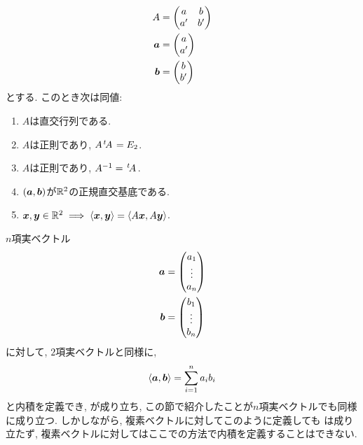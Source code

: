 \begin{prop}
  \begin{align*}
    A&=
    \begin{pmatrix}
      a&b\\
      a'&b'
    \end{pmatrix}\\
    \boldsymbol{a}&=
    \begin{pmatrix}
      a\\
      a'
    \end{pmatrix}\\
    \boldsymbol{b}&=
    \begin{pmatrix}
      b\\
      b'
    \end{pmatrix}
  \end{align*}
  とする.  このとき次は同値:
  \begin{enumerate}
  \item\label{thm:ortho:char:item:ortho}
    $A$は直交行列である.
  \item\label{thm:ortho:char:item:ortho2}
    $A$は正則であり, $A{\left.^{t}\!A\right.}=E_2$.
  \item\label{thm:ortho:char:item:transposeisinverse}
    $A$は正則であり, $A^{-1}={\left.^{t}\!A\right.}$.
  \item\label{thm:ortho:char:item:orthonormalbasis}
    $(\boldsymbol{a},\boldsymbol{b})$が$\mathbb{R}^2$の正規直交基底である.
  \item\label{thm:ortho:char:item:preserve}
    $\boldsymbol{x},\boldsymbol{y}\in \mathbb{R}^2\implies \braket{\boldsymbol{x},\boldsymbol{y}}=\braket{A\boldsymbol{x},A\boldsymbol{y}}$.
  \end{enumerate}
\end{prop}

\begin{remark}
  $n$項実ベクトル
  \begin{align*}
    \boldsymbol{a}&=\begin{pmatrix}a_1\\\vdots\\a_n\end{pmatrix}\\
    \boldsymbol{b}&=\begin{pmatrix}b_1\\\vdots\\b_n\end{pmatrix}
  \end{align*}
  に対して, $2$項実ベクトルと同様に,
  \begin{align*}
    \Braket{\boldsymbol{a},\boldsymbol{b}}=\sum_{i=1}^{n}a_ib_i
  \end{align*}
  と内積を定義でき,
  が成り立ち, 
  この節で紹介したことが$n$項実ベクトルでも同様に成り立つ.
  しかしながら,
  複素ベクトルに対してこのように定義しても
  は成り立たず,
  複素ベクトルに対してはここでの方法で内積を定義することはできない.
\end{remark}

